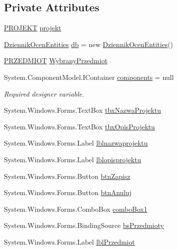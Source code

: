 \subsection*{Private Attributes}
\begin{DoxyCompactItemize}
\item 
\hyperlink{class_dziennik_ocen_1_1_p_r_o_j_e_k_t}{P\+R\+O\+J\+E\+KT} \hyperlink{class_dziennik_ocen_1_1_form_projekt_a67e21510e269671aa133417cb9b111b5}{projekt}
\item 
\hyperlink{class_dziennik_ocen_1_1_dziennik_ocen_entities}{Dziennik\+Ocen\+Entities} \hyperlink{class_dziennik_ocen_1_1_form_projekt_a101debfea501b130728811f5ee73f415}{db} = new \hyperlink{class_dziennik_ocen_1_1_dziennik_ocen_entities}{Dziennik\+Ocen\+Entities}()
\item 
\hyperlink{class_dziennik_ocen_1_1_p_r_z_e_d_m_i_o_t}{P\+R\+Z\+E\+D\+M\+I\+OT} \hyperlink{class_dziennik_ocen_1_1_form_projekt_acd30f5e99c7bfb0323343e82c63d1402}{Wybrany\+Przedmiot}
\item 
System.\+Component\+Model.\+I\+Container \hyperlink{class_dziennik_ocen_1_1_form_projekt_a26a32516eb0f6b9653a1146f3f29a508}{components} = null
\begin{DoxyCompactList}\small\item\em Required designer variable. \end{DoxyCompactList}\item 
System.\+Windows.\+Forms.\+Text\+Box \hyperlink{class_dziennik_ocen_1_1_form_projekt_a0d6905e62e6aaee937d2ac06cc7d1eb9}{tbx\+Nazwa\+Projektu}
\item 
System.\+Windows.\+Forms.\+Text\+Box \hyperlink{class_dziennik_ocen_1_1_form_projekt_a60d556129867f1fc819674f0a06419f3}{tbx\+Opis\+Projektu}
\item 
System.\+Windows.\+Forms.\+Label \hyperlink{class_dziennik_ocen_1_1_form_projekt_a90aa6092eacccd1b59a8bb49483e3296}{lblnazwaprojektu}
\item 
System.\+Windows.\+Forms.\+Label \hyperlink{class_dziennik_ocen_1_1_form_projekt_a42e7b5a957cabfffba8283926174edf4}{lblopisprojektu}
\item 
System.\+Windows.\+Forms.\+Button \hyperlink{class_dziennik_ocen_1_1_form_projekt_af6063055927dff58ceed268ae1fbfbe6}{btn\+Zapisz}
\item 
System.\+Windows.\+Forms.\+Button \hyperlink{class_dziennik_ocen_1_1_form_projekt_a7d9e4b326ea8c5f943db124d9c10a52d}{btn\+Anuluj}
\item 
System.\+Windows.\+Forms.\+Combo\+Box \hyperlink{class_dziennik_ocen_1_1_form_projekt_af9c3f48763789fdf806504520036b588}{combo\+Box1}
\item 
System.\+Windows.\+Forms.\+Binding\+Source \hyperlink{class_dziennik_ocen_1_1_form_projekt_a3809e13068b772ca98649868e729a1af}{bs\+Przedmioty}
\item 
System.\+Windows.\+Forms.\+Label \hyperlink{class_dziennik_ocen_1_1_form_projekt_a4b417edd61727b2a6cfbffdfc0683735}{lbl\+Przedmiot}
\end{DoxyCompactItemize}


